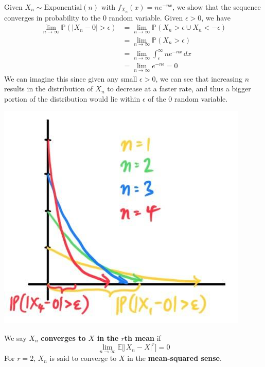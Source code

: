   \begin{example}
    Given $X_n \sim \mathrm{Exponential}(n)$ with $f_{X_n} (x) = n e^{-nx}$, we show that the sequence converges in probability to the $0$ random variable. Given $\epsilon > 0$, we have 
    \begin{align*}
      \lim_{n \rightarrow \infty} \mathbb{P}(|X_n - 0| > \epsilon) & = \lim_{n \rightarrow \infty} \mathbb{P}(X_n > \epsilon \cup X_n < -\epsilon) \\
      & = \lim_{n \rightarrow \infty} \mathbb{P}(X_n > \epsilon) \\
      & = \lim_{n \rightarrow \infty} \int_\epsilon^\infty n e^{-nx} \,dx \\
      & = \lim_{n \rightarrow \infty} e^{-n \epsilon} = 0
    \end{align*}
    We can imagine this since given any small $\epsilon > 0$, we can see that increasing $n$ results in the distribution of $X_n$ to decrease at a faster rate, and thus a bigger portion of the distribution would lie within $\epsilon$ of the $0$ random variable. 
    \begin{center}
      \includegraphics[scale=0.3]{img/convergence_in_prob_exponential.jpg}
    \end{center}
  \end{example}

  \begin{definition}
    We say $X_n$ \textbf{converges to $X$ in the $r$th mean} if 
    \begin{equation}
      \lim_{n \rightarrow \infty} \mathbb{E} \big[ |X_n - X|^r \big] = 0
    \end{equation}
    For $r = 2$, $X_n$ is said to converge to $X$ in the \textbf{mean-squared sense}. 
  \end{definition}


